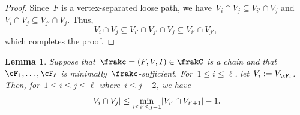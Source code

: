 \documentclass[11pt]{amsart}
\DeclarePairedDelimiter{\abs}{\lvert}{\rvert}
\newtheorem{lemma}[algocf]{Lemma}
\theoremstyle{definition}
\numberwithin{equation}{section}
\begin{document}
	\begin{proof}
		Since~$F$ is a vertex-separated loose path, we have~$V_i\cap V_j\subseteq V_{i'}\cap V_j$ and~$V_i\cap V_j\subseteq V_{j'}\cap V_j$.
		Thus,
		\begin{equation*}
			V_i\cap V_j
			\subseteq V_{i'}\cap V_{j'}\cap V_j
			\subseteq V_{i'}\cap V_{j'},
		\end{equation*}
		which completes the proof.
	\end{proof}
	
	
	\begin{lemma}\label{lemma: reduced copy vertex set intersections}
		Suppose that~$\frakc=(F,V,I)\in\frakC$ is a chain and that~$\cF_1,\ldots,\cF_\ell$ is minimally~$\frakc$-sufficient.
		For~$1\leq i\leq \ell$, let~$V_i:=V_{\cF_i}$.
		Then, for~$1\leq i\leq j\leq \ell$ where~$i\leq j-2$, we have
		\begin{equation*}
			\abs{V_i\cap V_j}\leq \min_{i\leq i'\leq j-1} \abs{V_{i'}\cap V_{i'+1}}-1.
		\end{equation*}
	\end{lemma}
	
\end{document}
